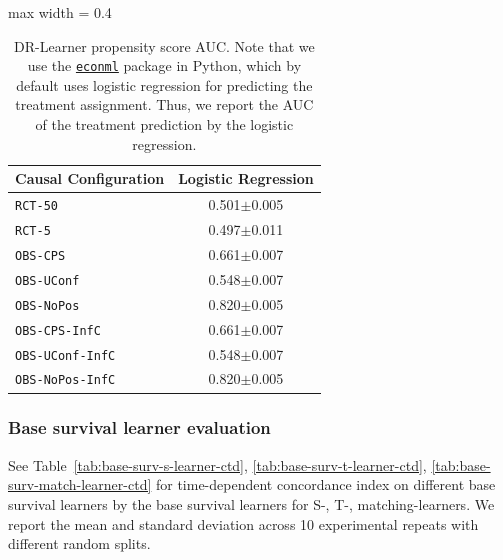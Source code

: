 \documentclass{article} %
\begin{document}
\begin{table}[!ht]
    \centering
    \caption{DR-Learner propensity score AUC. Note that we use the \href{https://econml.azurewebsites.net/index.html}{\texttt{econml}} package in Python, which by default uses logistic regression for predicting the treatment assignment. Thus, we report the AUC of the treatment prediction by the logistic regression.} \label{tab:base-dr-learner-propensity}
    \begin{adjustbox}{max width = 0.4\textwidth}
    \begin{tabular}{lc}
    \toprule
        \textbf{Causal Configuration} & \textbf{Logistic Regression} \\ 
    \midrule
        \texttt{RCT-50} & 0.501$\pm$0.005 \\ 
        \texttt{RCT-5} & 0.497$\pm$0.011 \\ 
        \texttt{OBS-CPS} & 0.661$\pm$0.007 \\ 
        \texttt{OBS-UConf} & 0.548$\pm$0.007 \\ 
        \texttt{OBS-NoPos} & 0.820$\pm$0.005 \\ 
        \texttt{OBS-CPS-InfC} & 0.661$\pm$0.007 \\ 
        \texttt{OBS-UConf-InfC} & 0.548$\pm$0.007 \\ 
        \texttt{OBS-NoPos-InfC} & 0.820$\pm$0.005 \\ 
    \bottomrule 
    \end{tabular}
    \end{adjustbox}
\end{table}


\clearpage
\subsubsection{Base survival learner evaluation} \label{subapp:base-surv-eval}
See Table~\ref{tab:base-surv-s-learner-ctd}, \ref{tab:base-surv-t-learner-ctd}, \ref{tab:base-surv-match-learner-ctd} for time-dependent concordance index on different base survival learners by the base survival learners for S-, T-, matching-learners. We report the mean and standard deviation across 10 experimental repeats with different random splits.
\end{document}
